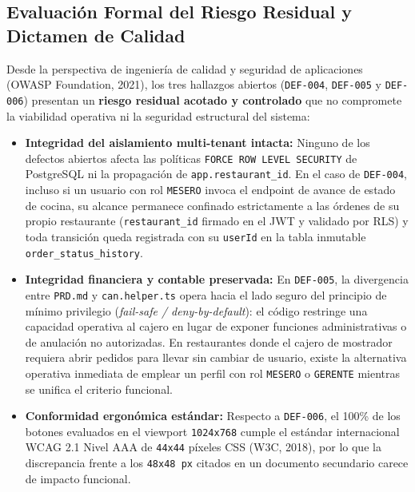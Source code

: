 \documentclass[stu,12pt,a4paper]{apa7}
\providecommand{\tightlist}{\setlength{\itemsep}{0pt}\setlength{\parskip}{0pt}}
\begin{document}
\begin{enumerate}
\end{enumerate}

\subsection{Evaluación Formal del Riesgo Residual y Dictamen de Calidad}\label{evaluaciuxf3n-formal-del-riesgo-residual-y-dictamen-de-calidad}

Desde la perspectiva de ingeniería de calidad y seguridad de aplicaciones (OWASP Foundation, 2021), los tres hallazgos abiertos (\texttt{DEF-{}\allowbreak{}004}, \texttt{DEF-{}\allowbreak{}005} y \texttt{DEF-{}\allowbreak{}006}) presentan un \textbf{riesgo residual acotado y controlado} que no compromete la viabilidad operativa ni la seguridad estructural del sistema:

\begin{itemize}
\tightlist
\item
  \textbf{Integridad del aislamiento multi-tenant intacta:} Ninguno de los defectos abiertos afecta las políticas \texttt{FORCE ROW LEVEL SE\allowbreak{}CURITY} de PostgreSQL ni la propagación de \texttt{app.\allowbreak{}restaurant\_\allowbreak{}id}. En el caso de \texttt{DEF-{}\allowbreak{}004}, incluso si un usuario con rol \texttt{MESERO} invoca el endpoint de avance de estado de cocina, su alcance permanece confinado estrictamente a las órdenes de su propio restaurante (\texttt{restaurant\_\allowbreak{}id} firmado en el JWT y validado por RLS) y toda transición queda registrada con su \texttt{userId} en la tabla inmutable \texttt{order\_\allowbreak{}status\_\allowbreak{}history}.
\item
  \textbf{Integridad financiera y contable preservada:} En \texttt{DEF-{}\allowbreak{}005}, la divergencia entre \texttt{PRD.\allowbreak{}md} y \texttt{can.\allowbreak{}helper.\allowbreak{}ts} opera hacia el lado seguro del principio de mínimo privilegio (\emph{fail-safe / deny-by-default}): el código restringe una capacidad operativa al cajero en lugar de exponer funciones administrativas o de anulación no autorizadas. En restaurantes donde el cajero de mostrador requiera abrir pedidos para llevar sin cambiar de usuario, existe la alternativa operativa inmediata de emplear un perfil con rol \texttt{MESERO} o \texttt{GERENTE} mientras se unifica el criterio funcional.
\item
  \textbf{Conformidad ergonómica estándar:} Respecto a \texttt{DEF-{}\allowbreak{}006}, el 100\% de los botones evaluados en el viewport \texttt{1024x768} cumple el estándar internacional WCAG 2.1 Nivel AAA de \texttt{44x44} píxeles CSS (W3C, 2018), por lo que la discrepancia frente a los \texttt{48x48 px} citados en un documento secundario carece de impacto funcional.
\end{itemize}
\end{document}
